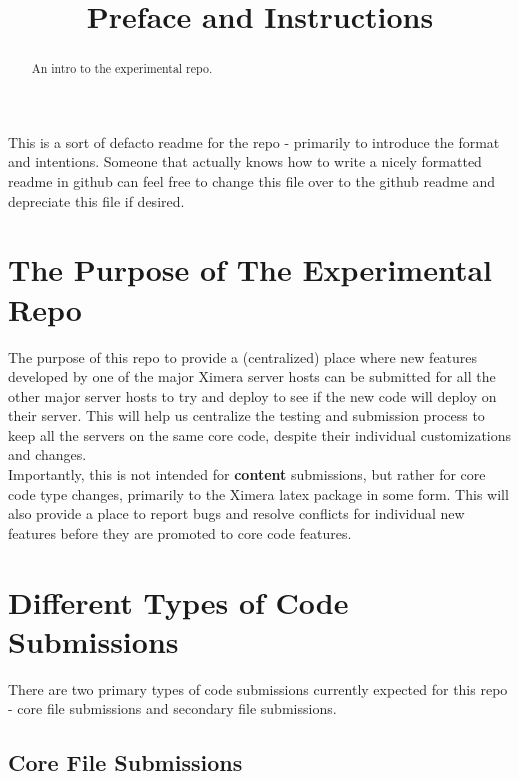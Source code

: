 \documentclass{ximera}
\title{Preface and Instructions}
\begin{document}
\begin{abstract}
    An intro to the experimental repo.
\end{abstract}
\maketitle

This is a sort of defacto readme for the repo - primarily to introduce the format and intentions. Someone that actually knows how to write a nicely formatted readme in github can feel free to change this file over to the github readme and depreciate this file if desired.

\section{The Purpose of The Experimental Repo}
    
    The purpose of this repo to provide a (centralized) place where new features developed by one of the major Ximera server hosts can be submitted for all the other major server hosts to try and deploy to see if the new code will deploy on their server. This will help us centralize the testing and submission process to keep all the servers on the same core code, despite their individual customizations and changes. \\
    
    Importantly, this is not intended for \textbf{content} submissions, but rather for core code type changes, primarily to the Ximera latex package in some form. This will also provide a place to report bugs and resolve conflicts for individual new features before they are promoted to core code features.
    
\section{Different Types of Code Submissions}
    
    There are two primary types of code submissions currently expected for this repo - core file submissions and secondary file submissions. 
    
    \subsection{Core File Submissions}
        
\end{document}
